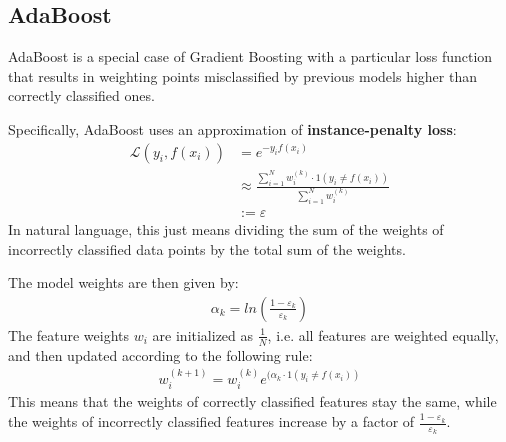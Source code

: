 \documentclass{report}
\renewcommand\epsilon{\varepsilon}
\newcommand{\tbf}{\textbf}
\newcommand*{\newpar}{\par\vspace{\baselineskip}\noindent}
\newcommand{\loss}{\mathcal{L}}
\begin{document}
\subsection{AdaBoost}
AdaBoost is a special case of Gradient Boosting with a particular loss function that results in
weighting points misclassified by previous models higher than correctly classified ones.
\newpar
Specifically, AdaBoost uses an approximation of \tbf{instance-penalty loss}:
\begin{align}
 \loss(y_i, f(x_i)) &= e^{-y_i f(x_i)}\\
 &\approx \frac{\sum_{i=1}^N w^{(k)}_i \cdot 1(y_i \neq f(x_i))}{\sum_{i=1}^N w^{(k)}_i}\\ &:= \epsilon
\end{align}
In natural language, this just means dividing the sum of the weights of incorrectly classified data points by the total sum of the weights.
\newpar
The model weights are then given by:
\begin{align}
 \alpha_k = ln\left(\frac{1 - \epsilon_k}{\epsilon_k}\right)
\end{align}
The feature weights $w_i$ are initialized as $\frac{1}{N}$, i.e. all features are weighted equally, and then updated according to the following rule:
\begin{align}
w_i^{(k+1)} = w_i^{(k)} e^{(\alpha_k \cdot 1(y_i \neq f(x_i))}
\end{align}
This means that the weights of correctly classified features stay the same, while the weights of incorrectly classified features increase by a factor of $\frac{1 - \epsilon_k}{\epsilon_k}$.
%
\end{document}
